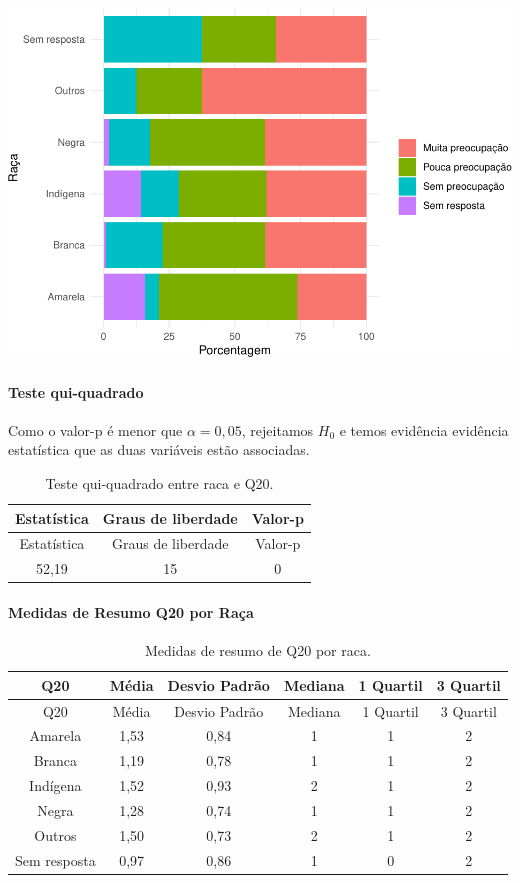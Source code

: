 \documentclass[]{article}
\let\oldparagraph\paragraph
\renewcommand{\paragraph}[1]{\oldparagraph{#1}\mbox{}}
\begin{document}
\begin{center}\includegraphics[width=0.75\linewidth]{relatorio_files/figure-latex/unnamed-chunk-310-1} \end{center}

\hypertarget{teste-qui-quadrado-35}{%
\paragraph{Teste qui-quadrado}\label{teste-qui-quadrado-35}}

Como o valor-p é menor que \(\alpha=0,05\), rejeitamos \(H_0\) e temos evidência evidência estatística que as duas variáveis estão associadas.

\begin{longtable}[]{@{}ccc@{}}
\caption{\label{tab:unnamed-chunk-311}Teste qui-quadrado entre raca e Q20.}\tabularnewline
\toprule
Estatística & Graus de liberdade & Valor-p\tabularnewline
\midrule
\endfirsthead
\toprule
Estatística & Graus de liberdade & Valor-p\tabularnewline
\midrule
\endhead
52,19 & 15 & 0\tabularnewline
\bottomrule
\end{longtable}

\cleardoublepage

\hypertarget{medidas-de-resumo-q20-por-rauxe7a}{%
\paragraph{Medidas de Resumo Q20 por Raça}\label{medidas-de-resumo-q20-por-rauxe7a}}

\begin{longtable}[]{@{}cccccc@{}}
\caption{\label{tab:unnamed-chunk-312}Medidas de resumo de Q20 por raca.}\tabularnewline
\toprule
Q20 & Média & Desvio Padrão & Mediana & 1 Quartil & 3 Quartil\tabularnewline
\midrule
\endfirsthead
\toprule
Q20 & Média & Desvio Padrão & Mediana & 1 Quartil & 3 Quartil\tabularnewline
\midrule
\endhead
Amarela & 1,53 & 0,84 & 1 & 1 & 2\tabularnewline
Branca & 1,19 & 0,78 & 1 & 1 & 2\tabularnewline
Indígena & 1,52 & 0,93 & 2 & 1 & 2\tabularnewline
Negra & 1,28 & 0,74 & 1 & 1 & 2\tabularnewline
Outros & 1,50 & 0,73 & 2 & 1 & 2\tabularnewline
Sem resposta & 0,97 & 0,86 & 1 & 0 & 2\tabularnewline
\bottomrule
\end{longtable}
\end{document}
